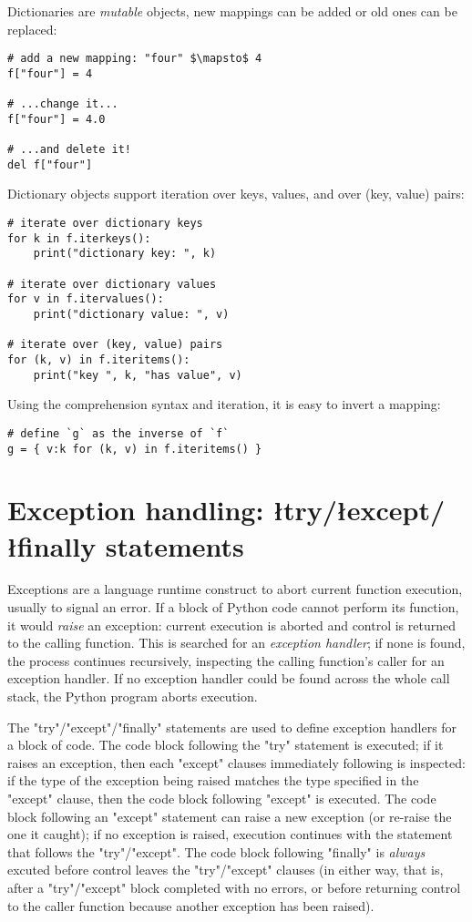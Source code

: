 {Dictionaries are \emph{mutable} objects, new mappings can be added or
old ones can be replaced:
\begin{lstlisting}
# add a new mapping: "four" $\mapsto$ 4
f["four"] = 4

# ...change it... 
f["four"] = 4.0

# ...and delete it!
del f["four"]
\end{lstlisting}

Dictionary objects support iteration over keys, values, and over (key,
value) pairs:
\begin{lstlisting}
# iterate over dictionary keys
for k in f.iterkeys(): 
    print("dictionary key: ", k)

# iterate over dictionary values
for v in f.itervalues(): 
    print("dictionary value: ", v)

# iterate over (key, value) pairs
for (k, v) in f.iteritems(): 
    print("key ", k, "has value", v)
\end{lstlisting}
Using the comprehension syntax and iteration, it is easy to invert a
mapping:
\begin{lstlisting}
# define `g` as the inverse of `f`
g = { v:k for (k, v) in f.iteritems() }
\end{lstlisting}


\section[Exception handling]{Exception handling: \l{try}/\l{except}/\l{finally} statements}
\label{sec:try-except-finally}

Exceptions are a language runtime construct to abort current function
execution, usually to signal an error.  If a block of Python code
cannot perform its function, it would \emph{raise} an exception:
current execution is aborted and control is returned to the calling
function.  This is searched for an \emph{exception handler}; if none
is found, the process continues recursively, inspecting the calling
function's caller for an exception handler.  If no exception handler
could be found across the whole call stack, the Python program aborts
execution.

The "try"/"except"/"finally" statements
are used to define exception handlers for a block of code.  The code
block following the "try" statement is executed; if it
raises an exception, then each "except" clauses immediately
following is inspected: if the type of the exception being raised
matches the type specified in the "except" clause, then the
code block following "except" is executed. The code block
following an "except" statement can raise a new exception
(or re-raise the one it caught); if no exception is raised, execution
continues with the statement that follows the
"try"/"except".  The code block following
"finally" is \emph{always} excuted before control leaves the
"try"/"except" clauses (in either way, that is,
after a "try"/"except" block completed with no
errors, or before returning control to the caller function because
another exception has been raised).

}
